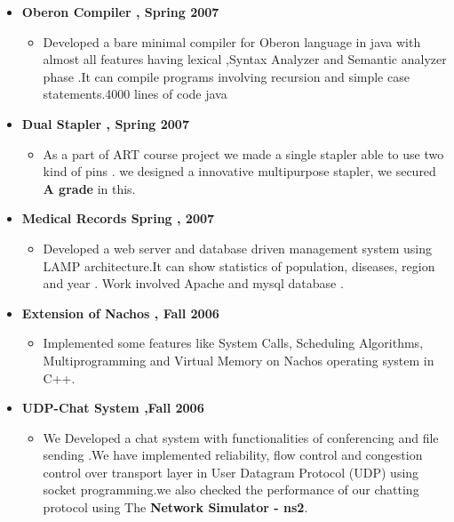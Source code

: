 \documentclass[margin]{res}
\makeatletter
\newcommand{\resitem}[1]{\item #1 \vspace{-2pt}}
\newcommand{\ressubheading}[4]{
\begin{tabular*}{6.5in}{l@{\extracolsep{\fill}}r}
		\textbf{#1} & #2 \\
		\textit{#3} & \textit{#4} \\
\end{tabular*}\vspace{-6pt}}
\makeatother
\begin{document}
\begin{itemize}
\begin{itemize}
		\end{itemize}			
	\vspace{-0.1in}
	\item \textbf{Oberon Compiler , Spring 2007}
		\vspace{-0.1in}
		\begin{itemize}
		\resitem{ Developed a bare minimal compiler for Oberon language in java with almost all  features having  lexical ,Syntax Analyzer and  Semantic analyzer phase .It can compile programs involving recursion and simple case statements.4000 lines of code java}
		\end{itemize}		
		
		\vspace{-0.1in}
			\item \textbf{Dual Stapler , Spring 2007}	
		\vspace{-0.1in}
		\begin{itemize}
		\resitem{As a part of ART course project we made a single stapler able to use two kind of pins . we  designed a innovative multipurpose stapler, we secured \textbf{A grade} in this.}
		\end{itemize}	
		\vspace{-0.1in}
			\item \textbf{Medical Records Spring , 2007}
		\vspace{-0.1in}
		\begin{itemize}
		\resitem{ Developed a web server and database driven management system  using LAMP architecture.It can show statistics of population, diseases, region and  year . Work involved Apache  and mysql database .}
	
		\end{itemize}	
		\vspace{-0.1in}
\item \textbf{Extension of Nachos , Fall 2006}
		\vspace{-0.1in}
		\begin{itemize}
		\resitem{Implemented some features like System Calls, Scheduling Algorithms, Multiprogramming and Virtual Memory on Nachos  operating system in C++.}
		\end{itemize}
	
	
\vspace{-0.1in}	
\item \textbf{UDP-Chat System ,Fall 2006}	
		\vspace{-0.1in}
		\begin{itemize}
		\resitem{We Developed a chat system with functionalities of conferencing and file sending .We have implemented reliability, flow control and congestion control over transport layer in User Datagram Protocol (UDP) using socket programming.we also checked the performance of our chatting protocol using The \textbf{Network Simulator - ns2}.}
		\end{itemize}
		

\end{itemize}
\end{document}
